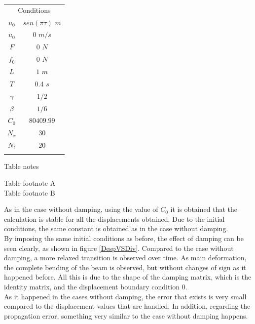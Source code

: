 \documentclass{ws-m3as}
\begin{document}
\begin{table}[ht]
{\begin{tabular}{@{}cc@{}} \toprule
\multicolumn{2}{c}{Conditions} \\
\colrule
$u_0$ &  $sen(\pi \tau)$ $m$ \\
$\dot{u}_0$ & $0$ $m/s$ \hphantom{000}\\
$F$ & $0$ $N$ \hphantom{00000}\\
$f_0$ & $0$ $N$ \hphantom{00000}\\
$L$ & $1$ $m$ \hphantom{00000}\\
$T$ & $0.4$ $s$ \hphantom{0000}\\
$\gamma$ & $1/2$ \hphantom{00000}\\
$\beta$ & $1/6$ \hphantom{00000}\\
$C_0$ & $80409.99$ \hphantom{0}\\
$N_x$ & $30$ \hphantom{000000}\\
$N_t$ & $20$ \hphantom{000000}\\ \botrule
\end{tabular}}
\begin{tabnote}
Table notes
\end{tabnote}
\begin{tabfootnote}
 Table footnote A\\
 Table footnote B
\end{tabfootnote}
\end{table}


As in the case without damping, using the value of $C_0$ it is obtained that the calculation is stable for all the displacements obtained. Due to the initial conditions, the same constant is obtained as in the case without damping.\\



By imposing the same initial conditions as before, the effect of damping can be seen clearly, as shown in figure \ref{DespVSDiv}. Compared to the case without damping, a more relaxed transition is observed over time. As main deformation, the complete bending of the beam is observed, but without changes of sign as it happened before. All this is due to the shape of the damping matrix, which is the identity matrix, and the displacement boundary condition 0.\\

As it happened in the cases without damping, the error that exists is very small compared to the displacement values that are handled. In addition, regarding the propagation error, something very similar to the case without damping happens. 
\end{document}
